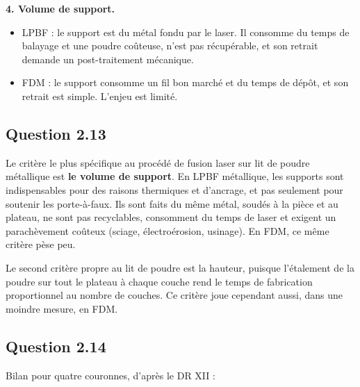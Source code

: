 \documentclass[11pt,a4paper]{article}
\providecommand{\tightlist}{\setlength{\itemsep}{0pt}\setlength{\parskip}{0pt}}
\begin{document}
\textbf{4. Volume de support.}

\begin{itemize}
\tightlist
\item
  LPBF : le support est du métal fondu par le laser. Il consomme du temps de balayage et une poudre coûteuse, n'est pas récupérable, et son retrait demande un post-traitement mécanique.
\item
  FDM : le support consomme un fil bon marché et du temps de dépôt, et son retrait est simple. L'enjeu est limité.
\end{itemize}

\hypertarget{question-2.13}{%
\subsection{Question 2.13}\label{question-2.13}}

Le critère le plus spécifique au procédé de fusion laser sur lit de poudre métallique est \textbf{le volume de support}. En LPBF métallique, les supports sont indispensables pour des raisons thermiques et d'ancrage, et pas seulement pour soutenir les porte-à-faux. Ils sont faits du même métal, soudés à la pièce et au plateau, ne sont pas recyclables, consomment du temps de laser et exigent un parachèvement coûteux (sciage, électroérosion, usinage). En FDM, ce même critère pèse peu.

Le second critère propre au lit de poudre est la hauteur, puisque l'étalement de la poudre sur tout le plateau à chaque couche rend le temps de fabrication proportionnel au nombre de couches. Ce critère joue cependant aussi, dans une moindre mesure, en FDM.

\hypertarget{question-2.14}{%
\subsection{Question 2.14}\label{question-2.14}}

Bilan pour quatre couronnes, d'après le DR XII :
\end{document}
